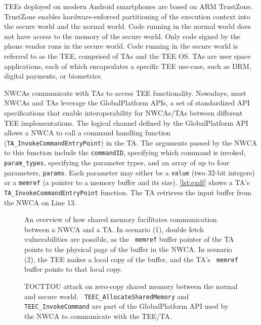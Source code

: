 \documentclass[conference]{IEEEtran} %
\providecommand{\DIFaddtex}[1]{{\protect\color{blue} \sf #1}} %
\providecommand{\DIFaddbegin}{} %
\providecommand{\DIFdelend}{} %
\providecommand{\DIFaddFL}[1]{\DIFadd{#1}} %
\providecommand{\DIFadd}[1]{\texorpdfstring{\DIFaddtex{#1}}{#1}} %
\begin{document}
\DIFdelend TEEs deployed on modern Android smartphones are based on ARM TrustZone. 
TrustZone enables hardware-enforced partitioning of the execution context into 
the secure world and the normal world. Code running in the normal world does not 
have access to the memory of the secure world. Only code signed by the phone 
vendor runs in the secure world. Code running in the secure world is referred 
to as the TEE, comprised of TAs and the TEE OS. TAs are user space applications, 
each of which encapsulates a specific TEE use-case, such as DRM, digital 
payments, or biometrics.

NWCAs communicate with TAs to access TEE functionality. Nowadays, most NWCAs and TAs 
leverage the GlobalPlatform APIs, a set of standardized API specifications that enable 
interoperability for NWCAs/TAs between different TEE implementations. The logical 
channel defined by the GlobalPlatform API allows a NWCA to call a command handling 
function (\texttt{TA\_InvokeCommandEntryPoint}) in the TA.  
The arguments passed by the NWCA to this function include the \texttt{commandID}, specifying 
which command is invoked, \texttt{param\_types}, specifying the parameter types, 
and an array of up to four parameters, \texttt{params}. 
Each parameter may either be a \texttt{value} (two 32-bit integers) or a 
\texttt{memref} (a pointer to a memory buffer and its size). 
\autoref{lst:exdf} shows a TA's \texttt{TA\_InvokeCommandEntryPoint} function.
The TA retrieves the input buffer from the NWCA on Line 13.

\DIFaddbegin \begin{figure}[h]
  \centering
  
  \caption{
    \DIFaddFL{An overview of how shared memory facilitates communication between a NWCA and a TA.
    In scenario (1), double fetch vulnerabilities are possible, as the }\texttt{\DIFaddFL{memref}} 
    \DIFaddFL{buffer pointer of the TA points to the physical page of the buffer in the NWCA. 
    In scenario (2), the TEE makes a local copy of the buffer, and the TA's }\texttt{\DIFaddFL{memref}} \DIFaddFL{buffer 
    points to that local copy.
    }}
  \label{fig:shmex}
\end{figure}
\begin{figure}[h]
  \centering
  
  \caption{
    \DIFaddFL{TOCTTOU attack on zero-copy shared memory between the normal and secure world.
    }\texttt{\DIFaddFL{TEEC\_AllocateSharedMemory}} \DIFaddFL{and }\texttt{\DIFaddFL{TEEC\_InvokeCommand}} \DIFaddFL{are part of the GlobalPlatform 
    API used by the NWCA to communicate with the TEE/TA.
    }}
  \label{fig:tocttouex}
\end{figure}
\end{document}
